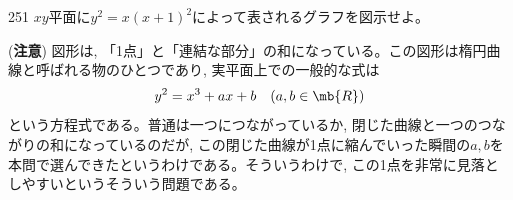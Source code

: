 \begin{prob}{251}{}{}
 $xy$平面に$y^2=x(x+1)^2$によって表されるグラフを図示せよ。\\
\end{prob}
(\textbf{注意}) 図形は, 「1点」と「連結な部分」の和になっている。この図形は楕円曲線と呼ばれる物のひとつであり, 実平面上での一般的な式は
\[y^2 = x^3+ ax + b\quad (a,b\in \mb{R})\]
という方程式である。普通は一つにつながっているか, 閉じた曲線と一つのつながりの和になっているのだが, この閉じた曲線が1点に縮んでいった瞬間の$a,b$を本問で選んできたというわけである。そういうわけで, この1点を非常に見落としやすいというそういう問題である。
